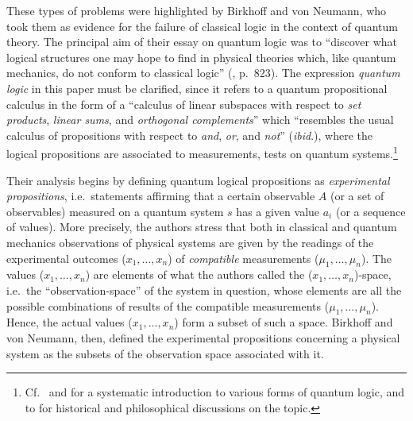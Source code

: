 \documentclass[11pt, executivepaper]{article}
\begin{document}
These types of problems were highlighted by Birkhoff and von Neumann, who took them as evidence for the failure of classical logic in the context of quantum theory. The principal aim of their essay on quantum logic was to ``discover what logical structures one may hope to find in physical theories which, like quantum mechanics, do not conform to classical logic'' (\cite{vonNeumann:1936}, p.\ 823). The expression \emph{quantum logic} in this paper must be clarified, since it refers to a quantum propositional calculus in the form of a ``calculus of linear subspaces with respect to \emph{set products}, \emph{linear sums}, and \emph{orthogonal complements}'' which ``resembles the usual calculus of propositions with respect to \emph{and}, \emph{or}, and \emph{not}'' (\emph{ibid}.), where the logical propositions are associated to measurements, tests on quantum systems.\footnote{Cf.\ \cite{Giuntini:2002} and \cite{DallaChiara:2004} for a systematic introduction to various forms of quantum logic, and to \cite{Engesser:2009} for historical and philosophical discussions on the topic.}

Their analysis begins by defining quantum logical propositions as \emph{experimental propositions}, i.e.\ statements affirming that a certain observable $A$ (or a set of observables) measured on a quantum system $s$ has a given value $a_i$ (or a sequence of values). More precisely, the authors stress that both in classical and quantum mechanics observations of physical systems are given by the readings of the experimental outcomes ($x_1, \dots, x_n$) of \emph{compatible} measurements ($\mu_1, \dots, \mu_n$). The values ($x_1, \dots, x_n$) are elements of what the authors called the ($x_1, \dots, x_n$)-space, i.e.\ the ``observation-space'' of the system in question, whose elements are all the possible combinations of results of the compatible measurements ($\mu_1, \dots, \mu_n$). Hence, the actual values ($x_1, \dots, x_n$) form a subset of such a space. Birkhoff and von Neumann, then, defined the experimental propositions concerning a physical system as the subsets of the observation space associated with it.
\end{document}

